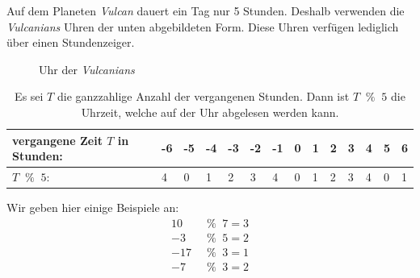 \begin{myexample}\label{myexample:clock}
Auf dem Planeten \textit{Vulcan} dauert ein Tag nur 5 Stunden. Deshalb verwenden die \textit{Vulcanians} Uhren der unten abgebildeten Form. Diese Uhren verfügen lediglich über einen Stundenzeiger.
\begin{figure}[H]
	\centering
	\caption{Uhr der \textit{Vulcanians}}
\end{figure}

\begin{table}[H]
	\begin{tabular}{llllllllllllll}
		{\color[HTML]{FE0000} vergangene Zeit $T$ in Stunden:} & {\color[HTML]{FE0000} -6} & {\color[HTML]{FE0000} -5} & {\color[HTML]{FE0000} -4} & {\color[HTML]{FE0000} -3} & {\color[HTML]{FE0000} -2} & {\color[HTML]{FE0000} -1} & {\color[HTML]{FE0000} 0} & {\color[HTML]{FE0000} 1} & {\color[HTML]{FE0000} 2} & {\color[HTML]{FE0000} 3} & {\color[HTML]{FE0000} 4} & {\color[HTML]{FE0000} 5} & {\color[HTML]{FE0000} 6} \\\midrule
		{\color[HTML]{3531FF} $T\; \;\%\; \; 5$:}              & {\color[HTML]{3531FF} 4}  & {\color[HTML]{3531FF} 0}  & {\color[HTML]{3531FF} 1}  & {\color[HTML]{3531FF} 2}  & {\color[HTML]{3531FF} 3}  & {\color[HTML]{3531FF} 4}  & {\color[HTML]{3531FF} 0} & {\color[HTML]{3531FF} 1} & {\color[HTML]{3531FF} 2} & {\color[HTML]{3531FF} 3} & {\color[HTML]{3531FF} 4} & {\color[HTML]{3531FF} 0} & {\color[HTML]{3531FF} 1} \\
	\end{tabular}
	\caption{Es sei $T$ die ganzzahlige Anzahl der vergangenen Stunden. Dann ist $T\; \;\%\; \; 5$ die Uhrzeit, welche auf der Uhr abgelesen werden kann.}
\end{table}
\end{myexample}

\begin{myexample}
Wir geben hier einige Beispiele an:
\begin{align*}
	10 \; & \;\%\; \; 7 = 3 \\
	-3 \; & \;\%\; \; 5 = 2 \\
	-17\; & \;\%\; \; 3 = 1 \\
	-7 \; & \;\%\; \; 3 = 2
\end{align*}
\end{myexample}

